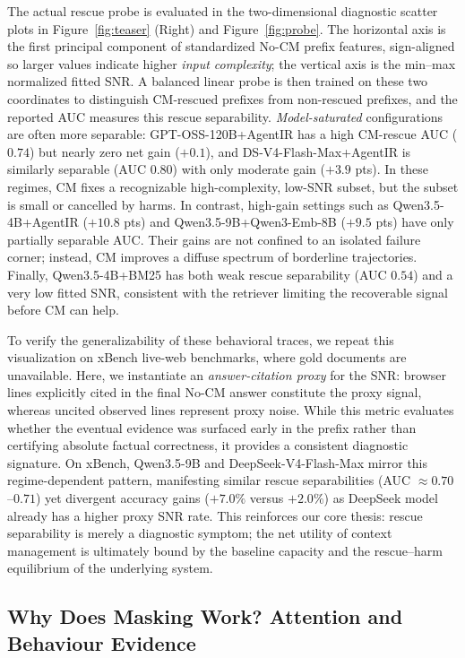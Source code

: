 The actual rescue probe is evaluated in the two-dimensional diagnostic scatter plots in Figure~\ref{fig:teaser} (Right) and Figure~\ref{fig:probe}.
The horizontal axis is the first principal component of standardized No-CM prefix features, sign-aligned so larger values indicate higher \emph{input complexity}; the vertical axis is the min--max normalized fitted SNR. A balanced linear probe is then trained on these two coordinates to distinguish CM-rescued prefixes from non-rescued prefixes, and the reported AUC measures this rescue separability. \emph{Model-saturated} configurations are often more separable: GPT-OSS-120B+AgentIR has a high CM-rescue AUC ($0.74$) but nearly zero net gain
($+0.1$), and DS-V4-Flash-Max+AgentIR is similarly separable (AUC $0.80$) with only moderate gain ($+3.9$ pts). In these regimes, CM fixes a recognizable
high-complexity, low-SNR subset, but the subset is small or cancelled by harms. In contrast, high-gain settings such as Qwen3.5-4B+AgentIR ($+10.8$ pts) and Qwen3.5-9B+Qwen3-Emb-8B ($+9.5$ pts) have only partially separable AUC. Their gains are not confined to an isolated failure corner; instead, CM improves a diffuse spectrum of borderline trajectories. Finally, Qwen3.5-4B+BM25 has both weak rescue separability
(AUC $0.54$) and a very low fitted SNR, consistent with the retriever limiting the recoverable signal before CM can help.

To verify the generalizability of these behavioral traces, we repeat this visualization on xBench live-web benchmarks, where gold documents are unavailable. Here, we instantiate an \emph{answer-citation proxy} for the SNR: browser lines explicitly cited in the final No-CM answer constitute the proxy signal, whereas uncited observed lines represent proxy noise. While this metric evaluates whether the eventual evidence was surfaced early in the prefix rather than certifying absolute factual correctness, it provides a consistent diagnostic signature. On xBench, {Qwen3.5-9B} and {DeepSeek-V4-Flash-Max} mirror this regime-dependent pattern, manifesting similar rescue separabilities (AUC $\approx 0.70$--$0.71$) yet divergent accuracy gains ($+7.0\%$ versus $+2.0\%$) as DeepSeek model already has a higher proxy SNR rate. This reinforces our core thesis: rescue separability is merely a diagnostic symptom; the net utility of context management is ultimately bound by the baseline capacity and the rescue--harm equilibrium of the underlying system.



\subsection{Why Does Masking Work? Attention and Behaviour Evidence}
\label{exp:why}

